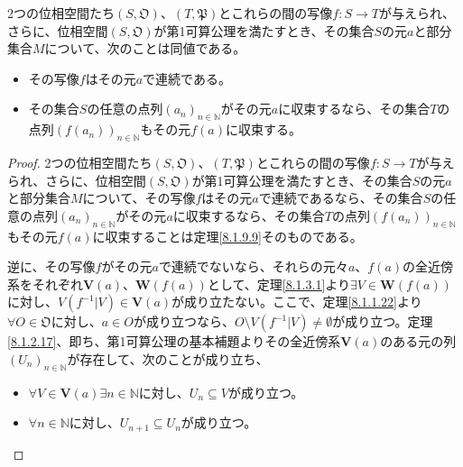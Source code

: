 \documentclass[dvipdfmx]{jsarticle}
\begin{document}
\begin{thm}\label{8.1.10.3}
2つの位相空間たち$\left( S,\mathfrak{O} \right)$、$\left( T,\mathfrak{P} \right)$とこれらの間の写像$f:S \rightarrow T$が与えられ、さらに、位相空間$\left( S,\mathfrak{O} \right)$が第1可算公理を満たすとき、その集合$S$の元$a$と部分集合$M$について、次のことは同値である。
\begin{itemize}
\item
  その写像$f$はその元$a$で連続である。
\item
  その集合$S$の任意の点列$\left( a_{n} \right)_{n \in \mathbb{N}}$がその元$a$に収束するなら、その集合$T$の点列$\left( f\left( a_{n} \right) \right)_{n \in \mathbb{N}}$もその元$f(a)$に収束する。
\end{itemize}
\end{thm}
\begin{proof}
2つの位相空間たち$\left( S,\mathfrak{O} \right)$、$\left( T,\mathfrak{P} \right)$とこれらの間の写像$f:S \rightarrow T$が与えられ、さらに、位相空間$\left( S,\mathfrak{O} \right)$が第1可算公理を満たすとき、その集合$S$の元$a$と部分集合$M$について、その写像$f$はその元$a$で連続であるなら、その集合$S$の任意の点列$\left( a_{n} \right)_{n \in \mathbb{N}}$がその元$a$に収束するなら、その集合$T$の点列$\left( f\left( a_{n} \right) \right)_{n \in \mathbb{N}}$もその元$f(a)$に収束することは定理\ref{8.1.9.9}そのものである。\par
逆に、その写像$f$がその元$a$で連続でないなら、それらの元々$a$、$f(a)$の全近傍系をそれぞれ$\mathbf{V}(a)$、$\mathbf{W}\left( f(a) \right)$として、定理\ref{8.1.3.1}より$\exists V \in \mathbf{W}\left( f(a) \right)$に対し、$V\left( f^{- 1}|V \right) \in \mathbf{V}(a)$が成り立たない。ここで、定理\ref{8.1.1.22}より$\forall O \in \mathfrak{O}$に対し、$a \in O$が成り立つなら、$O \setminus V\left( f^{- 1}|V \right) \neq \emptyset$が成り立つ。定理\ref{8.1.2.17}、即ち、第1可算公理の基本補題よりその全近傍系$\mathbf{V}(a)$のある元の列$\left( U_{n} \right)_{n \in \mathbb{N}}$が存在して、次のことが成り立ち、
\begin{itemize}
\item
  $\forall V \in \mathbf{V}(a)\exists n \in \mathbb{N}$に対し、$U_{n} \subseteq V$が成り立つ。
\item
  $\forall n \in \mathbb{N}$に対し、$U_{n + 1} \subseteq U_{n}$が成り立つ。
\end{itemize}

\end{proof}
\end{document}
